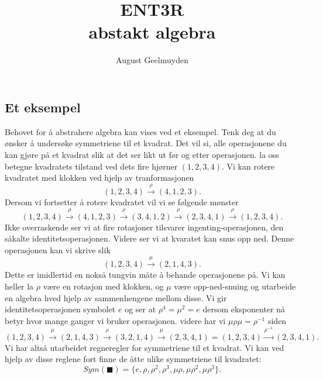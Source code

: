 \documentclass[a4paper, norsk, 12pt]{article}
\title{ \color{blue} \Huge ENT3R \\ \large abstakt algebra}
\author{ \color{blue} August Geelmuyden }
\date{}
\begin{document}
  \maketitle
\subsection*{Et eksempel}
Behovet for å abstrahere algebra kan vises ved et eksempel. Tenk deg at du ønsker å undersøke symmetriene til et kvadrat. Det vil si, alle operasjonene du kan gjøre på et kvadrat slik at det ser likt ut før og etter operasjonen. la oss betegne kvadratets tilstand ved dets fire hjørner $(1,2,3,4)$. Vi kan rotere kvadratet med klokken ved hjelp av tranformasjonen \[ (1,2,3,4) \overset{\rho}{\rightarrow} (4,1,2,3). \] Dersom vi fortsetter å rotere kvadratet vil vi se følgende mønster \[ (1,2,3,4) \overset{\rho}{\rightarrow} (4,1,2,3) \overset{\rho}{\rightarrow} (3,4,1,2) \overset{\rho}{\rightarrow} (2,3,4,1) \overset{\rho}{\rightarrow} (1,2,3,4). \]
Ikke overraskende ser vi at fire rotasjoner tilsvarer ingenting-operasjonen, den såkalte identitetsoperasjonen. Videre ser vi at kvaratet kan snus opp ned. Denne operasjonen kan vi skrive slik \[ (1,2,3,4) \overset{\mu}{\rightarrow} (2,1,4,3).  \]
Dette er imidlertid en nokså tungvin måte å behande operasjonene på. Vi kan heller la $\rho$ være en rotasjon med klokken, og $\mu$ være opp-ned-snuing og utarbeide en algebra hved hjelp av sammenhengene mellom disse. Vi gir identitetsoperasjonen symbolet $e$ og ser at $\rho^4 = \mu^2 = e$ dersom eksponenter nå betyr hvor mange ganger vi bruker operasjonen. videre har vi $\mu \rho \mu = \rho^{-1}$ siden 
\[ 
(1,2,3,4) \overset{\mu}{\rightarrow} (2,1,4,3) \overset{\rho}{\rightarrow} (3,2,1,4) \overset{\mu}{\rightarrow} (2,3,4,1) = (1,2,3,4) \overset{\rho^{-1}}{\rightarrow} (2,3,4,1).
\]
Vi har altså utarbeidet regneregler for symmetriene til et kvadrat. Vi kan ved hjelp av disse reglene fort finne de åtte ulike symmetriene til kvadratet:
\[ Sym(\blacksquare) = \{e,\rho,\rho^2,\rho^3, \mu \rho, \mu \rho^2, \mu \rho ^3 \}. \]
\end{document}
